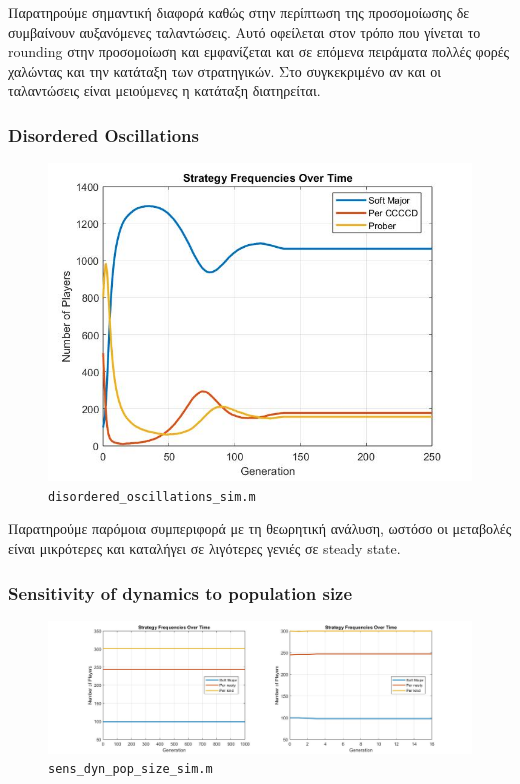 Παρατηρούμε σημαντική διαφορά καθώς στην περίπτωση της προσομοίωσης δε συμβαίνουν αυξανόμενες ταλαντώσεις. Αυτό οφείλεται στον τρόπο που γίνεται το rounding στην προσομοίωση και εμφανίζεται και σε επόμενα πειράματα πολλές φορές χαλώντας και την κατάταξη των στρατηγικών. Στο συγκεκριμένο αν και οι ταλαντώσεις είναι μειούμενες η κατάταξη διατηρείται.
\subsubsection{Disordered Oscillations}
\begin{figure}[th!]
\centering
\includegraphics[width=0.7\linewidth]{fit_plots_simulations/disordered_oscillations_sim}
\caption{\texttt{disordered\_oscillations\_sim.m}}
\label{fig:disorderedoscillationssim}
\end{figure}

Παρατηρούμε παρόμοια συμπεριφορά με τη θεωρητική ανάλυση, ωστόσο οι μεταβολές είναι μικρότερες και καταλήγει σε λιγότερες γενιές σε steady state.
\subsubsection{Sensitivity of dynamics to population size}
\begin{figure}[ht!]
\centering
\includegraphics[width=1\linewidth]{fit_plots_simulations/sensitivity_to_population_size_sim}
\caption{\texttt{sens\_dyn\_pop\_size\_sim.m}}
\label{fig:sensitivitytopopulationsizesim}
\end{figure}

